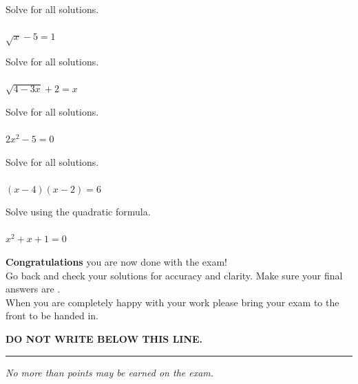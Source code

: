 \documentclass[addpoints,14pt,answers]{exam}
\begin{document}
\begin{questions}
\newpage

\question[4] Solve for all solutions.\\ \\ $\sqrt{x}-5=1$
\answerline

\question[5] Solve for all solutions.\\ \\ $\sqrt{4-3x}+2=x$
\answerline

\newpage

\question[4] Solve for all solutions.\\ \\ $2x^2-5=0$
\answerline

\question[5] Solve for all solutions.\\ \\ $(x-4)(x-2)=6$
\answerline

\newpage

\question[4] Solve using the quadratic formula.\\ \\ $x^2+x+1=0$
\answerline

\end{questions}

\newpage
\changefontsize{14pt}

\begin{tcolorbox}[colback=gray!15,colframe=black]
{\Large \textbf{Congratulations} you are now done with the exam!}\\

{Go back and check your solutions for accuracy and clarity.  Make sure your final answers are . }\\

{When you are completely happy with your work please bring your exam to the front to be handed in. }
\end{tcolorbox}


\vspace{1.5cm}

\vfill

\bigskip
\centerline{\textbf{DO NOT WRITE BELOW THIS LINE.}}
\rule{\textwidth}{.2mm}

\vfill

\begin{center}
	\gradetable[v][pages]
	
	\vspace{12pt}
	\textit{No more than \numpoints{} points may be earned on the exam.}
	
\end{center}
\end{document}
